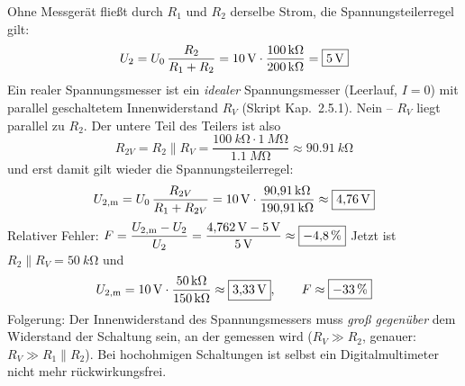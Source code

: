 \documentclass[11pt,a4paper]{article}
\begin{document}
\begin{loesung}
Ohne Messgerät fließt durch $R_1$ und $R_2$ derselbe Strom, die Spannungsteilerregel gilt:
\[
  U_2 = U_0\,\frac{R_2}{R_1+R_2} = \SI{10}{V}\cdot\frac{\SI{100}{k\ohm}}{\SI{200}{k\ohm}} = \boxed{\SI{5}{V}}
\]
Ein realer Spannungsmesser ist ein \emph{idealer} Spannungsmesser (Leerlauf, $I=0$) mit parallel geschaltetem Innenwiderstand $R_V$ (Skript Kap.~2.5.1).
Nein -- $R_V$ liegt parallel zu $R_2$. Der untere Teil des Teilers ist also
\[
  R_{2V} = R_2 \parallel R_V = \frac{\SI{100}{k\ohm}\cdot\SI{1}{M\ohm}}{\SI{1.1}{M\ohm}} \approx \SI{90.91}{k\ohm}
\]
und erst damit gilt wieder die Spannungsteilerregel:
\[
  U_{2,\text{m}} = U_0\,\frac{R_{2V}}{R_1+R_{2V}} = \SI{10}{V}\cdot\frac{\SI{90.91}{k\ohm}}{\SI{190.91}{k\ohm}} \approx \boxed{\SI{4.76}{V}}
\]
Relativer Fehler: $F = \dfrac{U_{2,\text{m}}-U_2}{U_2} = \dfrac{\SI{4.762}{V}-\SI{5}{V}}{\SI{5}{V}} \approx \boxed{\SI{-4.8}{\percent}}$
Jetzt ist $R_2\parallel R_V = \SI{50}{k\ohm}$ und
\[
  U_{2,\text{m}} = \SI{10}{V}\cdot\frac{\SI{50}{k\ohm}}{\SI{150}{k\ohm}} \approx \boxed{\SI{3.33}{V}}, \qquad F \approx \boxed{\SI{-33}{\percent}}
\]
Folgerung: Der Innenwiderstand des Spannungsmessers muss \emph{groß gegenüber} dem Widerstand der Schaltung sein, an der gemessen wird ($R_V \gg R_2$, genauer: $R_V \gg R_1\parallel R_2$). Bei hochohmigen Schaltungen ist selbst ein Digitalmultimeter nicht mehr rückwirkungsfrei.
\end{loesung}
\end{document}
